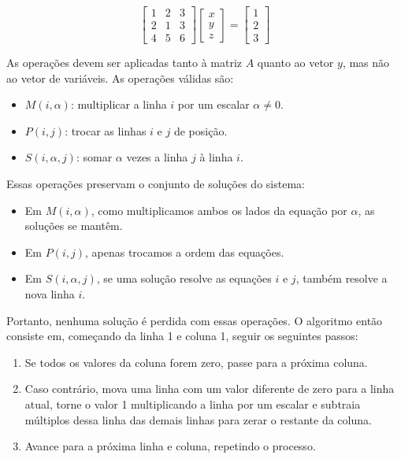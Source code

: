 \documentclass[11pt, a4paper]{article}
\begin{document}
\[
\begin{bmatrix}
1 & 2 & 3\\
2 & 1 & 3\\
4 & 5 & 6
\end{bmatrix}
\begin{bmatrix}
x\\
y\\
z
\end{bmatrix}
=
\begin{bmatrix}
1\\
2\\
3
\end{bmatrix}
\]

As operações devem ser aplicadas tanto à matriz \(A\) quanto ao vetor \(y\), mas não ao vetor de variáveis. As operações válidas são:

\begin{itemize}
    \item \(M(i, \alpha)\): multiplicar a linha \(i\) por um escalar \(\alpha \ne 0\).
    \item \(P(i,j)\): trocar as linhas \(i\) e \(j\) de posição.
    \item \(S(i, \alpha, j)\): somar \(\alpha\) vezes a linha \(j\) à linha \(i\).
\end{itemize}

Essas operações preservam o conjunto de soluções do sistema:

\begin{itemize}
    \item Em \(M(i, \alpha)\), como multiplicamos ambos os lados da equação por \(\alpha\), as soluções se mantêm.
    \item Em \(P(i, j)\), apenas trocamos a ordem das equações.
    \item Em \(S(i, \alpha, j)\), se uma solução resolve as equações \(i\) e \(j\), também resolve a nova linha \(i\).
\end{itemize}

Portanto, nenhuma solução é perdida com essas operações. O algoritmo então consiste em, começando da linha 1 e coluna 1, seguir os seguintes passos:

\begin{enumerate}
    \item Se todos os valores da coluna forem zero, passe para a próxima coluna.
    \item Caso contrário, mova uma linha com um valor diferente de zero para a linha atual, torne o valor 1 multiplicando a linha por um escalar e subtraia múltiplos dessa linha das demais linhas para zerar o restante da coluna.
    \item Avance para a próxima linha e coluna, repetindo o processo.
\end{enumerate}
\end{document}
